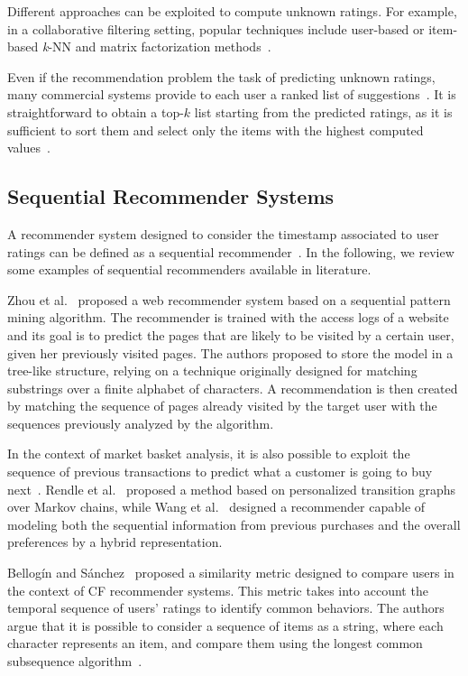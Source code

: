 Different approaches can be exploited to compute unknown ratings. For example, in a collaborative filtering setting, popular techniques include user-based or item-based \textit{k}-NN and matrix factorization methods~\cite{Jannach2010}.

Even if the recommendation problem  the task of predicting unknown ratings, many commercial systems provide to each user a ranked list of suggestions~\cite{Lu2015}.  It is straightforward to obtain a top-$k$ list starting from the predicted ratings, as it is sufficient to sort them and select only the items with the highest computed values~\cite{Adomavicius2015}.

\subsection{Sequential Recommender Systems}
\label{soa:sec:sequential}

A recommender system designed to consider the timestamp associated to user ratings can be defined as a sequential recommender~\cite{Quadrana2018}. In the following, we review some examples of sequential recommenders available in literature.

Zhou et al.~\cite{Zhou2004} proposed a web recommender system based on a sequential pattern mining algorithm. The recommender is trained with the access logs of a website and its goal is to predict the pages that are likely to be visited by a certain user, given her previously visited pages. The authors proposed to store the model in a tree-like structure, relying on a technique originally designed for matching substrings over a finite alphabet of characters. A recommendation is then created by matching the sequence of pages already visited by the target user with the sequences previously analyzed by the algorithm.

In the context of market basket analysis, it is also possible to exploit the sequence of previous transactions to predict what a customer is going to buy next~\cite{Aggarwal2015}. Rendle et al.~\cite{Rendle2010} proposed a method based on personalized transition graphs over Markov chains, while Wang et al.~\cite{Wang2015} designed a recommender capable of modeling both the sequential information from previous purchases and the overall preferences by a hybrid representation.

Bellog\'in and S\'anchez~\cite{Bellogin2017a} proposed a similarity metric designed to compare users in the context of CF recommender systems. This metric takes into account the temporal sequence of users' ratings to identify common behaviors. The authors argue that it is possible to consider a sequence of items as a string, where each character represents an item, and compare them using the longest common subsequence algorithm~\cite{Hirschberg1975}.

